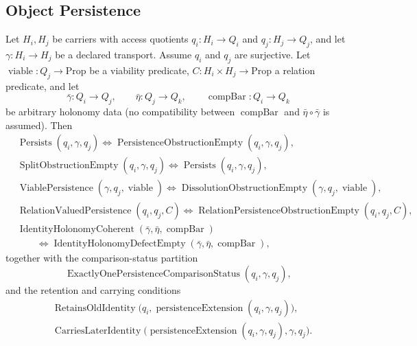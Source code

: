 \subsection{Object Persistence}\label{sec:status-records-coherence:object-persistence}

\begin{theorem}\label{thm:F19}
Let \(H_i,H_j\) be carriers with access quotients
\(q_i:H_i\to Q_i\) and \(q_j:H_j\to Q_j\), and let
\(\gamma:H_i\to H_j\) be a declared transport.  Assume \(q_i\) and
\(q_j\) are surjective.  Let
\(\operatorname{viable}:Q_j\to\mathrm{Prop}\) be a viability
predicate, \(C:H_i\times H_j\to\mathrm{Prop}\) a relation predicate,
and let
\[
  \bar\gamma:Q_i\to Q_j,\qquad
  \bar\eta:Q_j\to Q_k,\qquad
  \operatorname{compBar}:Q_i\to Q_k
\]
be arbitrary holonomy data (no compatibility between
\(\operatorname{compBar}\) and \(\bar\eta\circ\bar\gamma\) is
assumed).  Then
\begin{align*}
  &\operatorname{Persists}(q_i,\gamma,q_j)
    \iff
    \operatorname{PersistenceObstructionEmpty}(q_i,\gamma,q_j),\\
  &\operatorname{SplitObstructionEmpty}(q_i,\gamma,q_j)
    \iff
    \operatorname{Persists}(q_i,\gamma,q_j),\\
  &\operatorname{ViablePersistence}(\gamma,q_j,\operatorname{viable})
    \iff
    \operatorname{DissolutionObstructionEmpty}
      (\gamma,q_j,\operatorname{viable}),\\
  &\operatorname{RelationValuedPersistence}(q_i,q_j,C)
    \iff
    \operatorname{RelationPersistenceObstructionEmpty}(q_i,q_j,C),\\
  &\operatorname{IdentityHolonomyCoherent}
      (\bar\gamma,\bar\eta,\operatorname{compBar})\\
  &\qquad{}\iff
    \operatorname{IdentityHolonomyDefectEmpty}
      (\bar\gamma,\bar\eta,\operatorname{compBar}),
\end{align*}
together with the comparison-status partition
\[
  \operatorname{ExactlyOnePersistenceComparisonStatus}
    (q_i,\gamma,q_j),
\]
and the retention and carrying conditions
\begin{align*}
  &\operatorname{RetainsOldIdentity}
      \bigl(q_i,\operatorname{persistenceExtension}(q_i,\gamma,q_j)\bigr),\\
  &\operatorname{CarriesLaterIdentity}
      \bigl(\operatorname{persistenceExtension}(q_i,\gamma,q_j),
        \gamma,q_j\bigr).
\end{align*}
\end{theorem}
